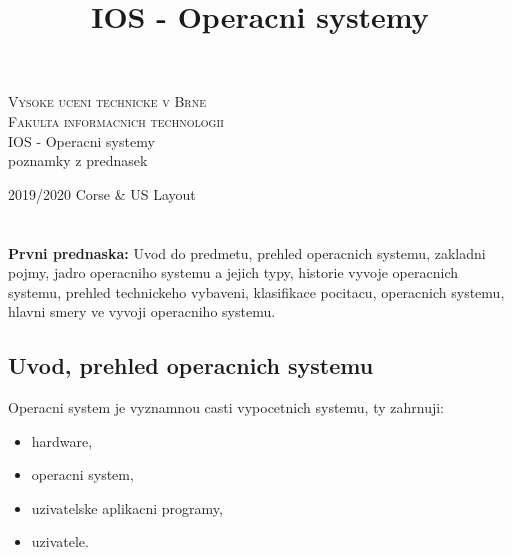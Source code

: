 \documentclass[a4paper, 11pt]{article}
\title{IOS - Operacni systemy}
\date{}
\begin{document}
\begin{titlepage}

\begin{center}
\LARGE
\textsc{\Huge Vysoke uceni technicke v Brne}\\
\textsc{\huge Fakulta informacnich technologii}\\
IOS - Operacni systemy\\[0.4em]
{\Huge poznamky z prednasek}
\end{center}
{\Large 2019/2020 \hfill Corse \& US Layout}

\end{titlepage}


\tableofcontents


\newpage

\section{}
\textbf{Prvni prednaska:} Uvod do predmetu, prehled operacnich systemu, zakladni pojmy, jadro operacniho systemu a jejich typy, historie vyvoje operacnich systemu, prehled technickeho vybaveni, klasifikace pocitacu, operacnich systemu, hlavni smery ve vyvoji operacniho systemu. \\
\subsection{Uvod, prehled operacnich systemu}

Operacni system je vyznamnou casti vypocetnich systemu, ty zahrnuji:
\begin{itemize}
    \item hardware, 
    \item operacni system,
    \item uzivatelske aplikacni programy,
    \item uzivatele. \\
\end{itemize}
\end{document}
